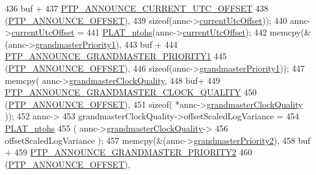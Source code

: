 \begin{DoxyCode}
{{{{{{{{436                    buf +
437                    \hyperlink{avbts__message_8hpp_acd887e469bb001b97f8eef87a997ae59}{PTP\_ANNOUNCE\_CURRENT\_UTC\_OFFSET}
438                    (\hyperlink{avbts__message_8hpp_aaa3da4fa4e9e4cfe49477cd7f6b95bca}{PTP\_ANNOUNCE\_OFFSET}),
439                    \textcolor{keyword}{sizeof}(annc->\hyperlink{class_p_t_p_message_announce_a4ee8eca04b1ccd7d8eaae5f0dd3a11fa}{currentUtcOffset}));
440             annc->\hyperlink{class_p_t_p_message_announce_a4ee8eca04b1ccd7d8eaae5f0dd3a11fa}{currentUtcOffset} =
441                 \hyperlink{linux_2src_2platform_8cpp_a6b8f3e7b87b66fa774a07ddc67f883a7}{PLAT\_ntohs}(annc->\hyperlink{class_p_t_p_message_announce_a4ee8eca04b1ccd7d8eaae5f0dd3a11fa}{currentUtcOffset});
442             memcpy(&(annc->\hyperlink{class_p_t_p_message_announce_a93988c82dd819cc976c32f9e006b97e3}{grandmasterPriority1}),
443                    buf +
444                    \hyperlink{avbts__message_8hpp_acd2f076b6ef0a6a45ac42baf1aecd300}{PTP\_ANNOUNCE\_GRANDMASTER\_PRIORITY1}
445                    (\hyperlink{avbts__message_8hpp_aaa3da4fa4e9e4cfe49477cd7f6b95bca}{PTP\_ANNOUNCE\_OFFSET}),
446                    \textcolor{keyword}{sizeof}(annc->\hyperlink{class_p_t_p_message_announce_a93988c82dd819cc976c32f9e006b97e3}{grandmasterPriority1}));
447             memcpy( annc->\hyperlink{class_p_t_p_message_announce_aa67cf6cb88ed67b2850993312a7cd5f2}{grandmasterClockQuality},
448                 buf+
449                 \hyperlink{avbts__message_8hpp_a972816df3b21a89930e21ac6a9617408}{PTP\_ANNOUNCE\_GRANDMASTER\_CLOCK\_QUALITY}
450                 (\hyperlink{avbts__message_8hpp_aaa3da4fa4e9e4cfe49477cd7f6b95bca}{PTP\_ANNOUNCE\_OFFSET}),
451                 \textcolor{keyword}{sizeof}( *annc->\hyperlink{class_p_t_p_message_announce_aa67cf6cb88ed67b2850993312a7cd5f2}{grandmasterClockQuality} ));
452             annc->
453               grandmasterClockQuality->offsetScaledLogVariance =
454               \hyperlink{linux_2src_2platform_8cpp_a6b8f3e7b87b66fa774a07ddc67f883a7}{PLAT\_ntohs}
455               ( annc->\hyperlink{class_p_t_p_message_announce_aa67cf6cb88ed67b2850993312a7cd5f2}{grandmasterClockQuality}->
456                 offsetScaledLogVariance );
457             memcpy(&(annc->\hyperlink{class_p_t_p_message_announce_a1e9e3c7867bf9eb557e5cf6edbd7f54a}{grandmasterPriority2}),
458                    buf +
459                    \hyperlink{avbts__message_8hpp_ad08230d0bcb3b40a12153ace07e585f9}{PTP\_ANNOUNCE\_GRANDMASTER\_PRIORITY2}
460                    (\hyperlink{avbts__message_8hpp_aaa3da4fa4e9e4cfe49477cd7f6b95bca}{PTP\_ANNOUNCE\_OFFSET}),
}}}}}}}}
\end{DoxyCode}
